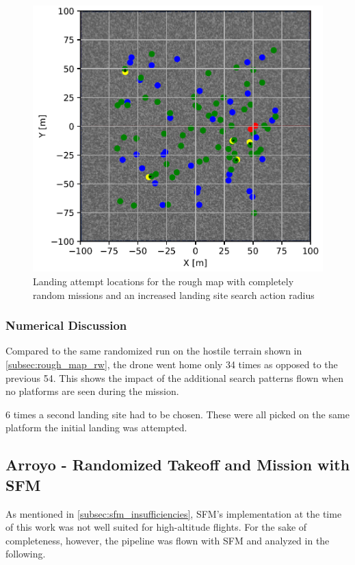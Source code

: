     \begin{figure}[h]
    \centering
    \includegraphics[scale=0.5]{images/evaluation/landing_rough_rand_lr.png}
    \caption{Landing attempt locations for the rough map with completely random missions and an increased landing site search action radius}
    \label{fig:land_rough_rand_radius}
    \end{figure}

    \subsubsection{Numerical Discussion}

    Compared to the same randomized run on the hostile terrain shown in \cref{subsec:rough_map_rw}, the drone went home only 34 times as opposed to the previous 54. This shows the impact of the additional search patterns flown when no platforms are seen during the mission. 

    6 times a second landing site had to be chosen. These were all picked on the same platform the initial landing was attempted. 
    

\subsection{Arroyo - Randomized Takeoff and Mission with SFM}\label{subsec:SFM_complete_rand}

    As mentioned in \cref{subsec:sfm_insufficiencies}, SFM's implementation at the time of this work was not well suited for high-altitude flights. For the sake of completeness, however, the pipeline was flown with SFM and analyzed in the following. 

